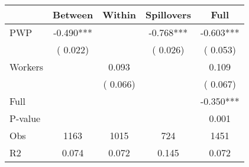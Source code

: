 
\begin{tabular}{l*{4}{c}}\hline&\multicolumn{1}{c}{Between}&\multicolumn{1}{c}{Within}&\multicolumn{1}{c}{Spillovers}&\multicolumn{1}{c}{Full}\\ \hline
 PWP           &             -0.490***      &                                               &       -0.768*** &        -0.603***                            \\ 
                               &        (       0.022)           &                                       &       (       0.026)     &      (       0.053)                                           \\ 
 Workers       &                                               &        0.093    &                                &             0.109                            \\ 
                               &                                               & (       0.066)                  &                                        &      (       0.067)                                           \\ 
\hline                                                                                                                                                                                                                                            
 Full                  &                                               &                                               &                                        &            -0.350***                                     \\ 
 P-value               &                                               &                                               &                                        &             0.001                                           \\ 
 Obs                   &               1163               &       1015                       &       724                &              1451                                               \\ 
 R2                    &                      0.074              &              0.072                      &              0.145               &                     0.072                                              \\ 
\hline \end{tabular}                                                                                                                                                                                                              